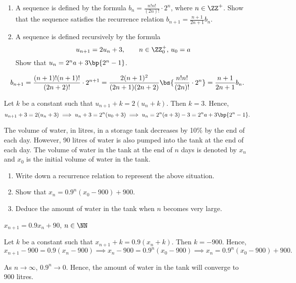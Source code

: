 \begin{problem}
    \begin{enumerate}
        \item A sequence is defined by the formula $b_n = \frac{n!n!}{(2n)!}\cdot2^n$, where $n \in \ZZ^+$. Show that the sequence satisfies the recurrence relation $b_{n+1} = \frac{n+1}{2n+1} b_n$.
        \item A sequence is defined recursively by the formula
        \[
            u_{n+1} = 2u_n + 3, \qquad n \in \ZZ_0^+, \, u_0 = a
        \]
        Show that $u_n = 2^na+3\bp{2^n - 1}$.
    \end{enumerate}
\end{problem}
\begin{solution}
    \begin{ppart}
        \[b_{n+1} = \frac{(n+1)! (n+1)!}{(2n+2)!}\cdot2^{n+1} = \frac{2(n+1)^2}{(2n+1)(2n+2)} \bs{\frac{n!n!}{(2n)!} \cdot 2^{n}} = \frac{n+1}{2n+1}b_n.\]
    \end{ppart}
    \begin{ppart}
        Let $k$ be a constant such that $u_{n+1} + k = 2(u_n + k)$. Then $k = 3$. Hence, \[u_{n+1} + 3 = 2(u_n + 3) \implies u_n +3 = 2^n(u_0 + 3) \implies u_n = 2^n (a + 3) - 3 = 2^n a + 3\bp{2^n - 1}.\]
    \end{ppart}
\end{solution}

\clearpage
\begin{problem}
    The volume of water, in litres, in a storage tank decreases by 10\% by the end of each day. However, 90 litres of water is also pumped into the tank at the end of each day. The volume of water in the tank at the end of $n$ days is denoted by $x_n$ and $x_0$ is the initial volume of water in the tank.

    \begin{enumerate}
        \item Write down a recurrence relation to represent the above situation.
        \item Show that $x_n = 0.9^n (x_0 - 900) + 900$.
        \item Deduce the amount of water in the tank when $n$ becomes very large.
    \end{enumerate}
\end{problem}
\begin{solution}
    \begin{ppart}
        $x_{n+1} = 0.9x_n + 90$, $n \in \NN$
    \end{ppart}
    \begin{ppart}
        Let $k$ be a constant such that $x_{n+1} + k = 0.9(x_n + k)$. Then $k = -900$. Hence, \[x_{n+1} - 900 = 0.9(x_n - 900) \implies x_n - 900 = 0.9^n (x_0 - 900) \implies x_n = 0.9^n (x_0 - 900) + 900.\]
    \end{ppart}
    \begin{ppart}
        As $n \to \infty$, $0.9^n \to 0$. Hence, the amount of water in the tank will converge to 900 litres.
    \end{ppart}
\end{solution}

